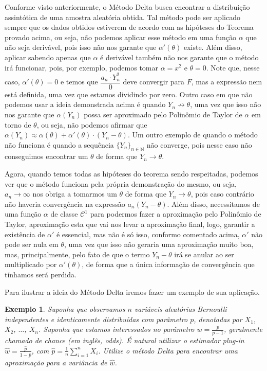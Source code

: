 \documentclass{article}
\newtheorem{example}{Exemplo}
\begin{document}
Conforme visto anteriormente, o Método Delta busca encontrar a distribuição assintótica de uma amostra aleatória obtida. Tal método pode ser aplicado sempre que os dados obtidos estiverem de acordo com as hipóteses do Teorema provado acima, ou seja, não podemos aplicar esse método em uma função $\alpha$ que não seja derivável, pois isso não nos garante que $\alpha'(\theta)$ existe. Além disso, aplicar sabendo apenas que $\alpha$ é derivável também não nos garante que o método irá funcionar, pois, por exemplo, podemos tomar $\alpha = x^2$ e $\theta = 0$. Note que, nesse caso, $\alpha'(\theta) = 0$ e temos que $\dfrac{a_n\cdot Y_n^2}{0}$ deve convergir para $F$, mas a expressão nem está definida, uma vez que estamos dividindo por zero. Outro caso em que não podemos usar a ideia demonstrada acima é quando $Y_n \not \to \theta$, uma vez que isso não nos garante que $\alpha(Y_n)$ possa ser aproximado pelo Polinômio de Taylor de $\alpha$ em torno de $\theta$, ou seja, não podemos afirmar que $\alpha(Y_n) \approx \alpha(\theta) + \alpha'(\theta)\cdot (Y_n - \theta)$. Um outro exemplo de quando o método não funciona é quando a sequência $\{Y_n\}_{n \in \mathbb{N}}$ não converge, pois nesse caso não conseguimos encontrar um $\theta$ de forma que $Y_n \to \theta$.

Agora, quando temos todas as hipóteses do teorema sendo respeitadas, podemos ver que o método funciona pela própria demonstração do mesmo, ou seja, $a_n \to \infty$ nos obriga a tomarmos um $\theta$ de forma que $Y_n \to \theta$, pois caso contrário não haveria convergência na expressão $a_n(Y_n - \theta)$. Além disso, necessitamos de uma função $\alpha$ de classe $\mathcal{C}^1$ para podermos fazer a aproximação pelo Polinômio de Taylor, aproximação esta que vai nos levar a aproximação final, logo, garantir a existência de $\alpha'$ é essencial, mas não é só isso, conformo comentado acima, $\alpha'$ não pode ser nula em $\theta$, uma vez que isso não geraria uma aproximação muito boa, mas, principalmente, pelo fato de que o termo $Y_n - \theta$ irá se anular ao ser multiplicado por $\alpha'(\theta)$, de forma que a única informação de convergência que tínhamos será perdida. 

Para ilustrar a ideia do Método Delta iremos fazer um exemplo de sua aplicação.

\begin{example}
    Suponha que observamos $n$ variáveis aleatórias Bernoulli independentes e identicamente distribuídas com parâmetro $p$, denotadas por $X_1$, $X_2$, $\dots$, $X_n$. Suponha que estamos interessados no parâmetro $w = \frac{p}{p - 1}$, geralmente chamado de \textit{chance} (em inglês, \textit{odds}). É natural utilizar o estimador \textit{plug-in} $\hat{w} = \frac{\hat{p}}{1 - \hat{p}}$, com $\hat{p} = \frac{1}{n}\sum_{i = 1}^{n} X_i$. Utilize o método Delta para encontrar uma aproximação para a variância de $\hat{w}$.
\end{example}
\end{document}
